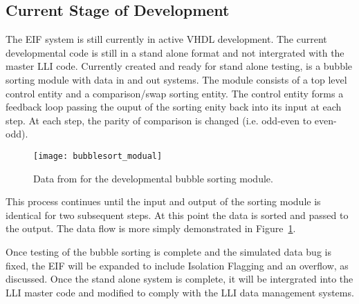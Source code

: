 
	\subsection{Current Stage of Development} 
		The EIF system is still currently in active VHDL development.
		The current developmental code is still in a stand alone format and not intergrated with the master LLI code.
		Currently created and ready for stand alone testing, is a bubble sorting module with data in and out systems.
		The module consists of a top level control entity and a comparison/swap sorting entity.
		The control entity forms a feedback loop passing the ouput of the sorting enity back into its input at each step.
		At each step, the parity of comparison is changed (i.e. odd-even to even-odd).
		\begin{figure}[h]
			\centering
			\texttt{[image: bubblesort\_modual]}
			\caption{Data from for the developmental bubble sorting module.}
			\label{fig:bubble_data_flow}
		\end{figure} \FloatBarrier
		\par
		This process continues until the input and output of the sorting module is identical for two subsequent steps.
		At this point the data is sorted and passed to the output.
		The data flow is more simply demonstrated in Figure~\ref{fig:bubble_data_flow}.
		\par
		Once testing of the bubble sorting is complete and the simulated data bug is fixed, the EIF will be expanded to include Isolation Flagging and an overflow, as discussed.
		Once the stand alone system is complete, it will be intergrated into the LLI master code and modified to comply with the LLI data management systems.
		\FloatBarrier